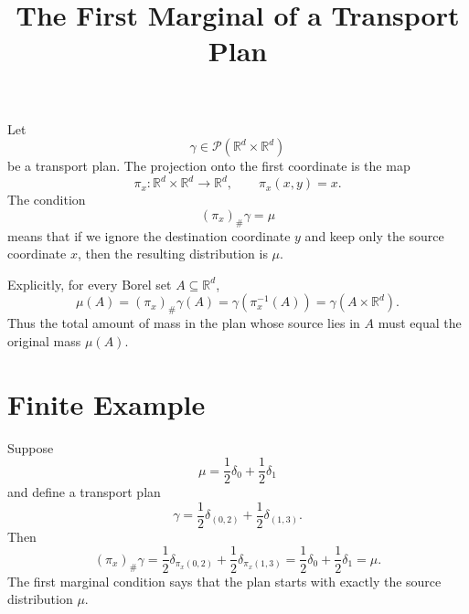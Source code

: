\documentclass[11pt]{article}
\title{The First Marginal of a Transport Plan}
\author{}
\date{}
\begin{document}
\maketitle

Let
\[
\gamma \in \mathcal P(\mathbb R^d\times \mathbb R^d)
\]
be a transport plan. The projection onto the first coordinate is the map
\[
\pi_x:\mathbb R^d\times\mathbb R^d\to\mathbb R^d,
\qquad
\pi_x(x,y)=x.
\]
The condition
\[
(\pi_x)_\#\gamma=\mu
\]
means that if we ignore the destination coordinate $y$ and keep only the source
coordinate $x$, then the resulting distribution is $\mu$.

Explicitly, for every Borel set $A\subseteq\mathbb R^d$,
\[
\mu(A)
=
(\pi_x)_\#\gamma(A)
=
\gamma(\pi_x^{-1}(A))
=
\gamma(A\times\mathbb R^d).
\]
Thus the total amount of mass in the plan whose source lies in $A$ must equal
the original mass $\mu(A)$.

\section*{Finite Example}

Suppose
\[
\mu=\frac12\delta_0+\frac12\delta_1
\]
and define a transport plan
\[
\gamma
=
\frac12\delta_{(0,2)}
+
\frac12\delta_{(1,3)}.
\]
Then
\[
(\pi_x)_\#\gamma
=
\frac12\delta_{\pi_x(0,2)}
+
\frac12\delta_{\pi_x(1,3)}
=
\frac12\delta_0+\frac12\delta_1
=
\mu.
\]
The first marginal condition says that the plan starts with exactly the source
distribution $\mu$.
\end{document}
